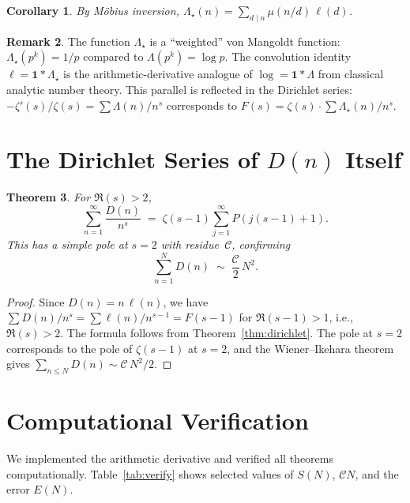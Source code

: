 \documentclass[11pt,a4paper]{amsart}
\theoremstyle{plain}
\newtheorem{theorem}{Theorem}[section]
\newtheorem{corollary}[theorem]{Corollary}
\theoremstyle{definition}
\newtheorem{remark}[theorem]{Remark}
\begin{document}
\begin{corollary}
By M\"obius inversion, $\Lambda_{\star}(n) = \sum_{d \mid n} \mu(n/d)\,\ell(d)$.
\end{corollary}

\begin{remark}
The function $\Lambda_{\star}$ is a ``weighted'' von Mangoldt function: 
$\Lambda_{\star}(p^k) = 1/p$ compared to $\Lambda(p^k) = \log p$.  
The convolution identity $\ell = \mathbf{1} * \Lambda_{\star}$ is 
the arithmetic-derivative analogue of $\log = \mathbf{1} * \Lambda$ 
from classical analytic number theory.  This parallel is reflected 
in the Dirichlet series: $-\zeta'(s)/\zeta(s) = \sum \Lambda(n)/n^s$ 
corresponds to $F(s) = \zeta(s) \cdot \sum \Lambda_{\star}(n)/n^s$.
\end{remark}

\section{The Dirichlet Series of $D(n)$ Itself}

\begin{theorem}\label{thm:Dfull}
For $\Re(s) > 2$,
\begin{equation}
\sum_{n=1}^{\infty} \frac{D(n)}{n^s} \;=\; \zeta(s-1) \sum_{j=1}^{\infty} P(j(s-1) + 1).
\end{equation}
This has a simple pole at $s = 2$ with residue~$\mathcal{C}$, confirming
\[
\sum_{n=1}^{N} D(n) \;\sim\; \frac{\mathcal{C}}{2}\,N^2.
\]
\end{theorem}

\begin{proof}
Since $D(n) = n\,\ell(n)$, we have $\sum D(n)/n^s = \sum \ell(n)/n^{s-1} = F(s-1)$ 
for $\Re(s-1) > 1$, i.e., $\Re(s) > 2$.  The formula follows from 
Theorem~\ref{thm:dirichlet}.  The pole at $s=2$ corresponds to the pole 
of $\zeta(s-1)$ at $s=2$, and the Wiener--Ikehara theorem gives 
$\sum_{n \le N} D(n) \sim \mathcal{C}\,N^2/2$.
\end{proof}

\section{Computational Verification}

We implemented the arithmetic derivative and verified all theorems computationally.
Table~\ref{tab:verify} shows selected values of $S(N)$, 
$\mathcal{C}N$, and the error $E(N)$.
\end{document}
